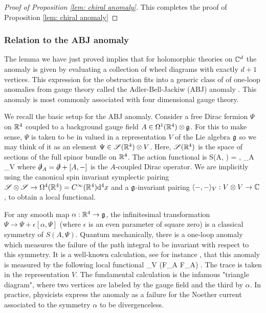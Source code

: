 \documentclass[11pt]{amsart}
\begin{document}
\begin{proof}[Proof of Proposition \ref{lem: chiral anomaly}]
This completes the proof of Proposition \ref{lem: chiral anomaly} 
\end{proof}

\subsubsection{Relation to the ABJ anomaly}

The lemma we have just proved implies that for holomorphic theories on $\mathbb C^d$ the anomaly is given by evaluating a collection of wheel diagrams with exactly $d+1$ vertices. 
This expression for the obstruction fits into a generic class of of one-loop anomalies from gauge theory called the Adler-Bell-Jackiw (ABJ) anomaly \cite{Adler, BJ}.
This anomaly is most commonly associated with four dimensional gauge theory.

We recall the basic setup for the ABJ anomaly. 
Consider a free Dirac fermion $\Psi$ on $\mathbb R^4$ coupled to a background gauge field $A \in \Omega^1(\mathbb R^4) \otimes \mathfrak g$. 
For this to make sense, $\Psi$ is taken to be in valued in a representation $V$ of the Lie algebra $\mathfrak g$ so we may think of it as an element $\Psi \in \mathscr S(\mathbb R^4) \otimes V$.
Here, $\mathscr S(\mathbb R^4)$ is the space of sections of the full spinor bundle on $\mathbb R^4$.
The action functional is
\ben
S(A, \Psi) = \int \<\Psi, \slashed\partial_A \Psi\>_V
\een
where $\slashed\partial_A = \slashed\partial + [A,-]$ is the $A$-coupled Dirac operator. 
We are implicitly using the canonical spin invariant symplectic pairing $\mathscr S \otimes \mathscr S \to \Omega^4(\mathbb R^4) = C^\infty(\mathbb R^4) {\rm d}^4 x$ and a $\mathfrak g$-invariant pairing $\langle-,-\rangle_V : V \otimes V \to \mathbb C$, to obtain a local functional.

For any smooth map $\alpha : \mathbb R^4 \to \mathfrak g$, the infinitesimal transformation $\Psi \to \Psi + \epsilon [\alpha, \Psi]$ (where $\epsilon$ is an even parameter of square zero) is a classical symmetry of $S(A, \Psi)$. 
Quantum mechanically, there is a one-loop anomaly which measures the failure of the path integral to be invariant with respect to this symmetry. 
It is a well-known calculation, see for instance \cite{FujikawaSuzuki}, that this anomaly is measured by the following local functional
\be\label{ABJ}
\int \Tr_V \left(\alpha F_A F_A\right) .
\ee
The trace is taken in the representation $V$.
The fundamental calculation is the infamous "triangle diagram", 
where two vertices are labeled by the gauge field and the third by $\alpha$.
In practice, physicists express the anomaly as a failure for the Noether current associated to the symmetry $\alpha$ to be divergenceless. 
\end{document}
